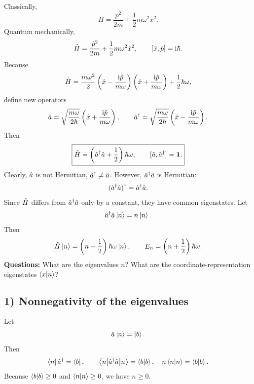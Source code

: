 Classically,
\begin{equation}
H=\frac{p^2}{2m}+\frac12m\omega^2x^2.
\end{equation}
Quantum mechanically,
\begin{equation}
\hat{H}=\frac{\hat{p}^2}{2m}+\frac12m\omega^2\hat{x}^2,\qquad
[\hat{x},\hat{p}]=\mathrm{i}\hbar.
\end{equation}
Because
\begin{equation}
\hat{H}=\frac{m\omega^2}{2}
\left(\hat{x}-\frac{\mathrm{i}\hat{p}}{m\omega}\right)
\left(\hat{x}+\frac{\mathrm{i}\hat{p}}{m\omega}\right)
+\frac12\hbar\omega,
\end{equation}
define new operators
\begin{equation}
\hat{a}=\sqrt{\frac{m\omega}{2\hbar}}
\left(\hat{x}+\frac{\mathrm{i}\hat{p}}{m\omega}\right),\qquad
\hat{a}^{\dagger}=\sqrt{\frac{m\omega}{2\hbar}}
\left(\hat{x}-\frac{\mathrm{i}\hat{p}}{m\omega}\right).
\end{equation}
Then
\begin{equation}
\boxed{\hat{H}=\left(\hat{a}^{\dagger}\hat{a}+\frac12\right)\hbar\omega,\qquad
[\hat{a},\hat{a}^{\dagger}]=\mathbf1.}
\end{equation}
Clearly, $\hat{a}$ is not Hermitian, $\hat{a}^{\dagger}\ne\hat{a}$. However, $\hat{a}^{\dagger}\hat{a}$ is Hermitian:
\begin{equation}
(\hat{a}^{\dagger}\hat{a})^{\dagger}=\hat{a}^{\dagger}\hat{a}.
\end{equation}
Since $\hat{H}$ differs from $\hat{a}^{\dagger}\hat{a}$ only by a constant, they have common eigenstates. Let
\begin{equation}
\hat{a}^{\dagger}\hat{a}\left|n\right\rangle=n\left|n\right\rangle.
\end{equation}
Then
\begin{equation}
\hat{H}\left|n\right\rangle=\left(n+\frac12\right)\hbar\omega\left|n\right\rangle,\qquad
E_n=\left(n+\frac12\right)\hbar\omega.
\end{equation}
\textbf{Questions:} What are the eigenvalues $n$? What are the coordinate-representation eigenstates $\left\langle x\middle|n\right\rangle$?

\subsection*{1) Nonnegativity of the eigenvalues}
Let
\begin{equation}
\hat{a}\left|n\right\rangle=\left|b\right\rangle.
\end{equation}
Then
\begin{equation}
\left\langle n\right|\hat{a}^{\dagger}=\left\langle b\right|,\qquad
\left\langle n\middle|\hat{a}^{\dagger}\hat{a}\middle|n\right\rangle=\left\langle b\middle|b\right\rangle,\quad
n\left\langle n\middle|n\right\rangle=\left\langle b\middle|b\right\rangle.
\end{equation}
Because $\left\langle b\middle|b\right\rangle\ge0$ and $\left\langle n\middle|n\right\rangle\ge0$, we have $n\ge0$.

